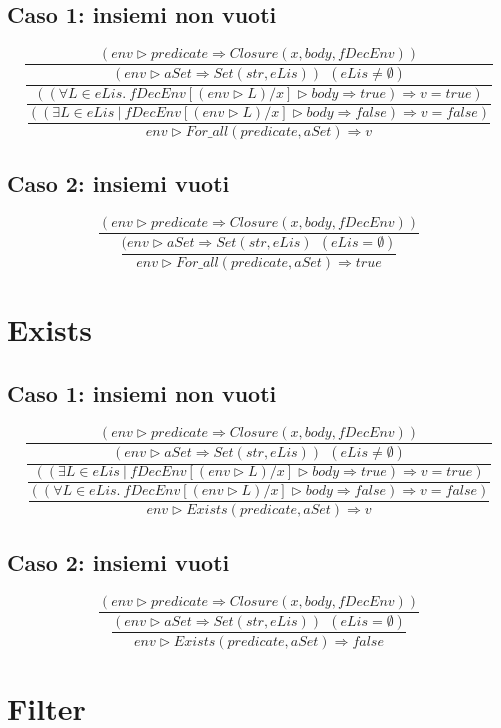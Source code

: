 \documentclass[10pt, italian, openany]{book}
\begin{document}
\subsection*{Caso 1: insiemi non vuoti}
\[
\dfrac
	{(env \rhd predicate \Longrightarrow Closure(x, body, fDecEnv)) }
	{\dfrac
		{ (env \rhd aSet \Longrightarrow Set(str, eLis)) \ \ (eLis \neq \emptyset) }
		{\dfrac
			{((\forall L \in eLis. \ fDecEnv[ (env \rhd L) / x] \rhd body \Longrightarrow true) \Longrightarrow v = true)}
			{\dfrac
				{((\exists L \in eLis \ | \ fDecEnv[ (env \rhd L) / x] \rhd body \Longrightarrow false) \Longrightarrow v = false)}
				{env \rhd For\_all(predicate, aSet) \Longrightarrow v}
			}
		}
	}
\]
\subsection*{Caso 2: insiemi vuoti}
\[
\dfrac
	{(env \rhd predicate \Longrightarrow Closure(x, body, fDecEnv)) }
	{\dfrac
		{ (env \rhd aSet \Longrightarrow Set(str, eLis) \ \ (eLis = \emptyset) }
		{env \rhd For\_all(predicate, aSet) \Longrightarrow true}
	}
\]

\section*{Exists}
\subsection*{Caso 1: insiemi non vuoti}
\[
\dfrac
	{(env \rhd predicate \Longrightarrow Closure(x, body, fDecEnv)) }
	{\dfrac
		{ (env \rhd aSet \Longrightarrow Set(str, eLis)) \ \ (eLis \neq \emptyset) }
		{\dfrac
			{((\exists L \in eLis\ | \ fDecEnv[ (env \rhd L) / x] \rhd body \Longrightarrow true) \Longrightarrow v = true)}
			{\dfrac
				{((\forall L \in eLis. \ fDecEnv[ (env \rhd L) / x] \rhd body \Longrightarrow false) \Longrightarrow v = false)}
				{env \rhd Exists(predicate, aSet) \Longrightarrow v}
			}
		}
	}
\]
\subsection*{Caso 2: insiemi vuoti}
\[
\dfrac
	{(env \rhd predicate \Longrightarrow Closure(x, body, fDecEnv)) }
	{\dfrac
		{(env \rhd aSet \Longrightarrow Set(str, eLis)) \ \ (eLis = \emptyset)}
		{env \rhd Exists(predicate, aSet) \Longrightarrow false}
	}
\]
\section*{Filter}
\end{document}

